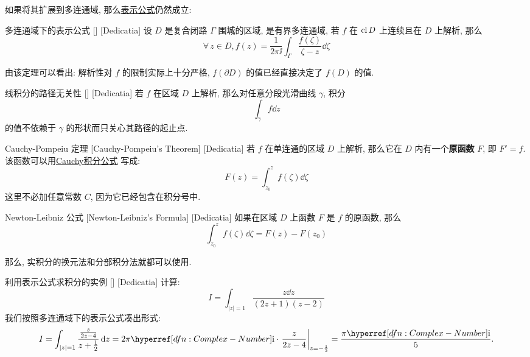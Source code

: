         如果将其扩展到多连通域, 那么\hyperref[crl:Cauchy-Representing-Formula]{表示公式}仍然成立: 

        \begin{crl}
            {多连通域下的表示公式}
            []
            [Dedicatia]
            设 \(D\) 是复合闭路 \(\Gamma\) 围城的区域, 是有界多连通域, 若 \(f\) 在 \(\operatorname{cl} D\) 上连续且在 \(D\) 上解析, 那么
            \[\forall\, z\in D, f(z)=\frac{1}{2\pi\ii}\int_\Gamma\frac{f(\zeta)}{\zeta-z}\dd{\zeta} \]
        \end{crl}

        \begin{rmk}
            [Dedicatia]
            由该定理可以看出: 解析性对 \(f\) 的限制实际上十分严格,  \(f(\partial D)\) 的值已经直接决定了 \(f(D)\) 的值. 
        \end{rmk}

        \begin{crl}
            {线积分的路径无关性}
            []
            [Dedicatia]
            若 \(f\) 在区域 \(D\) 上解析, 那么对任意分段光滑曲线 \(\gamma\), 积分
            \[\int_\gamma f\dd{z}\]
            的值不依赖于 \(\gamma\) 的形状而只关心其路径的起止点. 
        \end{crl}

        \begin{thm}
            {Cauchy-Pompeiu 定理}
            [Cauchy-Pompeiu's Theorem]
            [Dedicatia]
            若 \(f\) 在单连通的区域 \(D\) 上解析, 那么它在 \(D\) 内有一个\textbf{原函数} \(F\), 即 \(F'=f\). 该函数可以用\hyperref[thm:Cauchy-Int-Formula]{Cauchy积分公式} 写成: 
            \[F(z)=\int_{z_0}^z f(\zeta)\dd{\zeta}\]
            这里不必加任意常数 \(C\), 因为它已经包含在积分号中. 
        \end{thm}

        \begin{thm}
            {Newton-Leibniz 公式}
            [Newton-Leibniz's Formula]
            [Dedicatia]
            如果在区域 \(D\) 上函数 \(F\) 是 \(f\) 的原函数, 那么
            \[\int_{z_0}^z f(\zeta)\dd{\zeta}=F(z)-F(z_0)\]
        \end{thm}

        那么, 实积分的换元法和分部积分法就都可以使用. 

        \begin{xmp}
            {利用表示公式求积分的实例}
            []
            [Dedicatia]
            计算: 
            \[I=\int_{|z|=1}\frac{z\dd{z}}{(2z+1)(z-2)}\]
            我们按照多连通域下的表示公式凑出形式: 
            \[I=\int_{|z|=1}\frac{\frac{z}{2z-4}}{z+\frac{1}{2}}\dd{z}=2\pi\ii\cdot\eval{\frac{z}{2z-4}}_{z=-\frac{1}{2}}=\frac{\pi\ii}{5}.\]
        \end{xmp}

